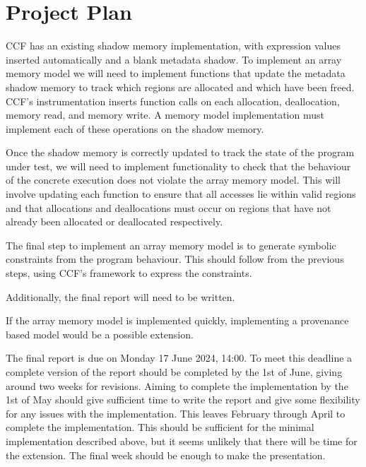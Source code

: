 \documentclass[12pt,twoside]{report}
\begin{document}
\chapter{Project Plan}

CCF has an existing shadow memory implementation, with expression values inserted automatically and a blank metadata shadow. To implement an array memory model we will need to implement functions that update the metadata shadow memory to track which regions are allocated and which have been freed. CCF's instrumentation inserts function calls on each allocation, deallocation, memory read, and memory write. A memory model implementation must implement each of these operations on the shadow memory.

Once the shadow memory is correctly updated to track the state of the program under test, we will need to implement functionality to check that the behaviour of the concrete execution does not violate the array memory model. This will involve updating each function to ensure that all accesses lie within valid regions and that allocations and deallocations must occur on regions that have not already been allocated or deallocated respectively.

The final step to implement an array memory model is to generate symbolic constraints from the program behaviour. This should follow from the previous steps, using CCF's framework to express the constraints. 

Additionally, the final report will need to be written.

If the array memory model is implemented quickly, implementing a provenance based model would be a possible extension.


The final report is due on Monday 17 June 2024, 14:00. To meet this deadline a complete version of the report should be completed by the 1st of June, giving around two weeks for revisions. Aiming to complete the implementation by the 1st of May should give sufficient time to write the report and give some flexibility for any issues with the implementation. This leaves February through April to complete the implementation. This should be sufficient for the minimal implementation described above, but it seems unlikely that there will be time for the extension. The final week should be enough to make the presentation.
\end{document}
